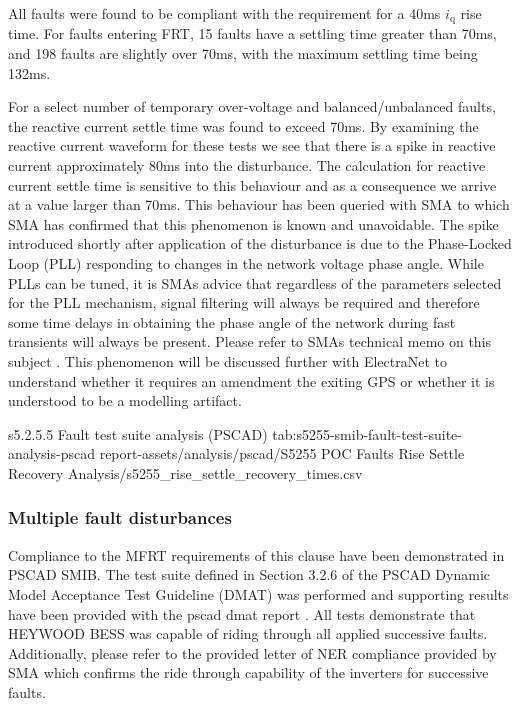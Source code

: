 \documentclass{../grid-link-report}
\newcommand{\analysisdir}{report-assets/analysis}
\begin{document}
	All faults were found to be compliant with the requirement for a 40ms $i_{\text{q}}$ rise time. For faults entering FRT, 15 faults have a settling time greater than 70ms, and 198 faults are slightly over 70ms, with the maximum settling time being 132ms.
	
	For a select number of temporary over-voltage and balanced/unbalanced faults, the reactive current settle time was found to exceed 70ms. By examining the reactive current waveform for these tests we see that there is a spike in reactive current approximately 80ms into the disturbance. The calculation for reactive current settle time is sensitive to this behaviour and as a consequence we arrive at a value larger than 70ms. This behaviour has been queried with SMA to which SMA has confirmed that this phenomenon is known and unavoidable. The spike introduced shortly after application of the disturbance is due to the Phase-Locked Loop (PLL) responding to changes in the network voltage phase angle. While PLLs can be tuned, it is SMAs advice that regardless of the parameters selected for the PLL mechanism, signal filtering will always be required and therefore some time delays in obtaining the phase angle of the network during fast transients will always be present. Please refer to SMAs technical memo on this subject \cite{sma-iq-settle}. This phenomenon will be discussed further with ElectraNet to understand whether it requires an amendment the exiting GPS or whether it is understood to be a modelling artifact. 
	
	

	{
		\fontsize{6.5}{7}\selectfont
		\autoscaledlongtable
		{s5.2.5.5 Fault test suite analysis (PSCAD)}
		{tab:s5255-smib-fault-test-suite-analysis-pscad}
		{\analysisdir/pscad/S5255 POC Faults Rise Settle Recovery Analysis/s5255_rise_settle_recovery_times.csv}
	}

	

	
	\subsubsection{Multiple fault disturbances}
	Compliance to the MFRT requirements of this clause have been demonstrated in PSCAD SMIB. The test suite defined in Section 3.2.6 of the PSCAD Dynamic Model Acceptance Test Guideline (DMAT) \cite{dmat-guideline} was performed and supporting results have been provided with the pscad dmat report \cite{pscad-mfrt-dmat}. All tests demonstrate that HEYWOOD BESS was capable of riding through all applied successive faults. Additionally, please refer to the provided letter of NER compliance \cite{ner-compliance} provided by SMA which confirms the ride through capability of the inverters for successive faults.
	
\end{document}
